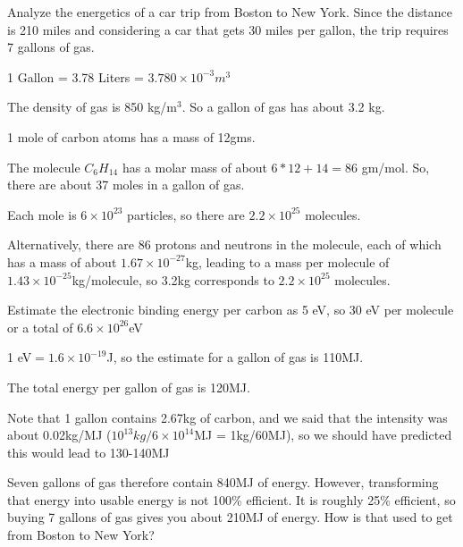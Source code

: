 \documentclass[11pt]{book}
\begin{document}


Analyze the energetics of a car trip from Boston to New York. Since the distance is 210 miles and considering a car that gets 30 miles per gallon, the trip requires 7 gallons of gas. 


\bei
\item 1 Gallon = 3.78 Liters = $3.780\times 10^{-3} m^3$
\item
The density of gas is  850 kg/m$^3$. So a gallon of gas has about 3.2 kg. 
\item 1 mole of carbon atoms has a mass of 12gms.
\item The molecule $C_6H_{14}$ has a molar mass of about $6*12+14=86$ gm/mol. So, there are about 37 moles in a gallon of gas. 
\item Each mole is $6\times 10^{23}$ particles, so there are $2.2\times 10^{25}$ molecules. 
\item Alternatively, there are 86 protons and neutrons in the molecule, each of which has a mass of about $1.67\times 10^{-27}$kg, leading to a mass per molecule of $1.43\times 10^{-25}$kg/molecule, so 3.2kg corresponds to $2.2\times 10^{25}$ molecules.
\item Estimate the electronic binding energy per carbon as 5 eV, so 30 eV per molecule or a total of $6.6\times 10^{26}$eV 
\item 1 eV$=1.6\times 10^{-19}$J, so the estimate for a gallon of gas is 110MJ.
\item The total energy per gallon of gas is 120MJ.
\item Note that 1 gallon contains 2.67kg of carbon, and we said that the intensity was about 0.02kg/MJ ($10^{13}kg/6\times10^{14}$MJ = 1kg/60MJ), so we should have predicted this would lead to 130-140MJ
\eei

Seven gallons of gas therefore contain 840MJ of energy. However, transforming that energy into usable energy is not 100\% efficient. It is roughly 25\% efficient, so buying 7 gallons of gas gives you about 210MJ of energy. How is that used to get from Boston to New York?
\end{document}
